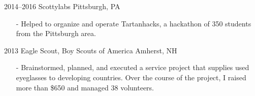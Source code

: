 \documentclass[print]{template/friggeri-cv}
\begin{document}
    \begin{entrylist}
        \entrys
            {2014--2016}
            {Scottylabs}
            {Pittsburgh, PA}
            {\begin{itemize}[leftmargin=*]
                \item[-] Helped to organize and operate Tartanhacks, a hackathon of 350 students from the Pittsburgh area.
            \end{itemize}}
        \entrys
            {2013}
            {Eagle Scout, {\normalfont Boy Scouts of America}}
            {Amherst, NH}
            {\begin{itemize}[leftmargin=*]
                \item[-] Brainstormed, planned, and executed a service project that supplies used eyeglasses to developing countries. Over the course of the project, I raised more than \$650 and managed 38 volunteers.
            \end{itemize}}
    \end{entrylist}
\end{document}
